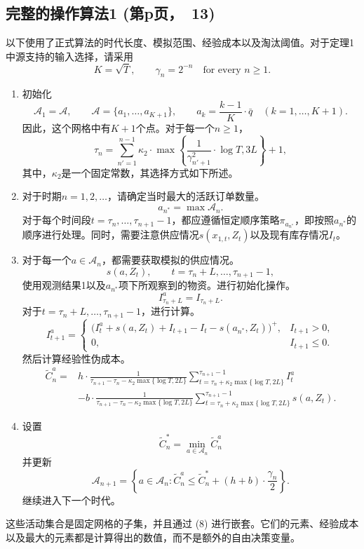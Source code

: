 \documentclass{article}
\begin{document}
\subsection*{完整的操作算法1 (第p页，\ 13)}
以下使用了正式算法的时代长度、模拟范围、经验成本以及淘汰阈值。对于定理1中源支持的输入选择，请采用
\[
K=\sqrt T,\qquad\gamma_n=2^{-n}\quad\text{for every }n\geq1.
\]
\begin{enumerate}
\item 初始化
\[
\mathcal A_1=\mathcal A,\qquad
\mathcal A=\{a_1,\ldots,a_{K+1}\},\qquad
 a_k=\frac{k-1}{K}\cdot\bar q\quad(k=1,\ldots,K+1).
\]
因此，这个网格中有\(K+1\)个点。对于每一个\(n\geq1\)，
\[
\tau_n=\sum_{n'=1}^{n-1}\kappa_2\cdot
\max\left\{\frac{1}{\gamma_{n'+1}^{2}}\cdot\log T,3L\right\}+1,
\]
其中，\(\kappa_2\)是一个固定常数，其选择方式如下所述。

\item 对于时期\(n=1,2,\ldots\)，请确定当时最大的活跃订单数量。
\[
a_{n^*}=\max\mathcal A_n.
\]
对于每个时间段\(t=\tau_n,\ldots,\tau_{n+1}-1\)，都应遵循恒定顺序策略\(\pi_{a_{n^*}}\)，即按照\(a_{n^*}\)的顺序进行处理。同时，需要注意供应情况\(s(x_{1,t},Z_t)\)以及现有库存情况\(I_t\)。

\item 对于每一个\(a\in\mathcal A_n\)，都需要获取模拟的供应情况。
\[
s(a,Z_t),\qquad t=\tau_n+L,\ldots,\tau_{n+1}-1,
\]
使用观测结果1以及\(a_{n^*}\)项下所观察到的物资。进行初始化操作。
\[
I^a_{\tau_n+L}=I_{\tau_n+L}.
\]
对于\(t=\tau_n+L,\ldots,\tau_{n+1}-1\)，进行计算。
\[
I^a_{t+1}=\begin{cases}
\big(I^a_t+s(a,Z_t)+I_{t+1}-I_t-s(a_{n^*},Z_t)\big)^+,
& I_{t+1}>0,\\
0,&I_{t+1}\leq0.
\end{cases}
\]
然后计算经验性伪成本。
\begin{align*}
\tilde C_n^a
={}&h\cdot\frac{1}{\tau_{n+1}-\tau_n-\kappa_2\max\{\log T,2L\}}
\sum_{t=\tau_n+\kappa_2\max\{\log T,2L\}}^{\tau_{n+1}-1} I_t^a\\
&-b\cdot\frac{1}{\tau_{n+1}-\tau_n-\kappa_2\max\{\log T,2L\}}
\sum_{t=\tau_n+\kappa_2\max\{\log T,2L\}}^{\tau_{n+1}-1}s(a,Z_t).
\end{align*}

\item 设置
\[
\tilde C_n^*=\min_{a\in\mathcal A_n}\tilde C_n^a
\]
并更新
\begin{equation}
\mathcal A_{n+1}
=\left\{a\in\mathcal A_n:
\tilde C_n^a\leq\tilde C_n^*+(h+b)\cdot\frac{\gamma_n}{2}\right\}.\tag{8}
\end{equation}
继续进入下一个时代。
\end{enumerate}
这些活动集合是固定网格的子集，并且通过 (8) 进行嵌套。它们的元素、经验成本以及最大的元素都是计算得出的数值，而不是额外的自由决策变量。
\end{document}
